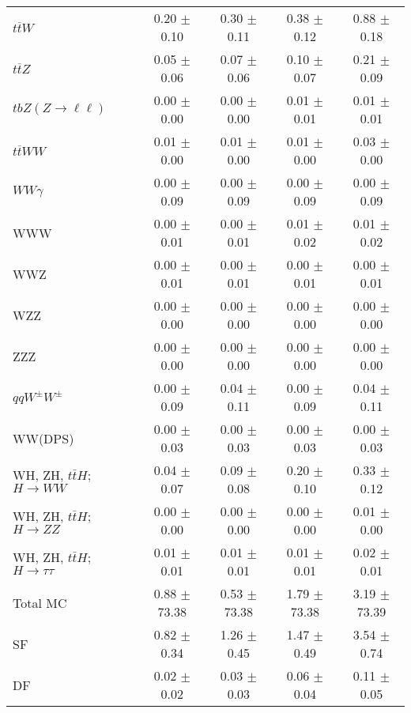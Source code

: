 \begin{tabular}{l|cccc}
                   $t\overline{t}W$ &  0.20 $\pm$  0.10 &  0.30 $\pm$  0.11 &  0.38 $\pm$  0.12 &  0.88 $\pm$  0.18 \\
                   $t\overline{t}Z$ &  0.05 $\pm$  0.06 &  0.07 $\pm$  0.06 &  0.10 $\pm$  0.07 &  0.21 $\pm$  0.09 \\
    $tbZ (Z \rightarrow \ell \ell)$ &  0.00 $\pm$  0.00 &  0.00 $\pm$  0.00 &  0.01 $\pm$  0.01 &  0.01 $\pm$  0.01 \\
                  $t\overline{t}WW$ &  0.01 $\pm$  0.00 &  0.01 $\pm$  0.00 &  0.01 $\pm$  0.00 &  0.03 $\pm$  0.00 \\
                         $WW\gamma$ &  0.00 $\pm$  0.09 &  0.00 $\pm$  0.09 &  0.00 $\pm$  0.09 &  0.00 $\pm$  0.09 \\
                                WWW &  0.00 $\pm$  0.01 &  0.00 $\pm$  0.01 &  0.01 $\pm$  0.02 &  0.01 $\pm$  0.02 \\
                                WWZ &  0.00 $\pm$  0.01 &  0.00 $\pm$  0.01 &  0.00 $\pm$  0.01 &  0.00 $\pm$  0.01 \\
                                WZZ &  0.00 $\pm$  0.00 &  0.00 $\pm$  0.00 &  0.00 $\pm$  0.00 &  0.00 $\pm$  0.00 \\
                                ZZZ &  0.00 $\pm$  0.00 &  0.00 $\pm$  0.00 &  0.00 $\pm$  0.00 &  0.00 $\pm$  0.00 \\
                 $qqW^{\pm}W^{\pm}$ &  0.00 $\pm$  0.09 &  0.04 $\pm$  0.11 &  0.00 $\pm$  0.09 &  0.04 $\pm$  0.11 \\
                            WW(DPS) &  0.00 $\pm$  0.03 &  0.00 $\pm$  0.03 &  0.00 $\pm$  0.03 &  0.00 $\pm$  0.03 \\
WH, ZH, $t\bar{t}H$; $H \rightarrow WW$ &  0.04 $\pm$  0.07 &  0.09 $\pm$  0.08 &  0.20 $\pm$  0.10 &  0.33 $\pm$  0.12 \\
WH, ZH, $t\bar{t}H$; $H \rightarrow ZZ$ &  0.00 $\pm$  0.00 &  0.00 $\pm$  0.00 &  0.00 $\pm$  0.00 &  0.01 $\pm$  0.00 \\
WH, ZH, $t\bar{t}H$; $H \rightarrow \tau\tau$ &  0.01 $\pm$  0.01 &  0.01 $\pm$  0.01 &  0.01 $\pm$  0.01 &  0.02 $\pm$  0.01 \\
\hline\hline
                           Total MC &  0.88 $\pm$ 73.38 &  0.53 $\pm$ 73.38 &  1.79 $\pm$ 73.38 &  3.19 $\pm$ 73.39 \\
\hline
                                 SF &  0.82 $\pm$  0.34 &  1.26 $\pm$  0.45 &  1.47 $\pm$  0.49 &  3.54 $\pm$  0.74 \\
                                 DF &  0.02 $\pm$  0.02 &  0.03 $\pm$  0.03 &  0.06 $\pm$  0.04 &  0.11 $\pm$  0.05 \\

\end{tabular}
